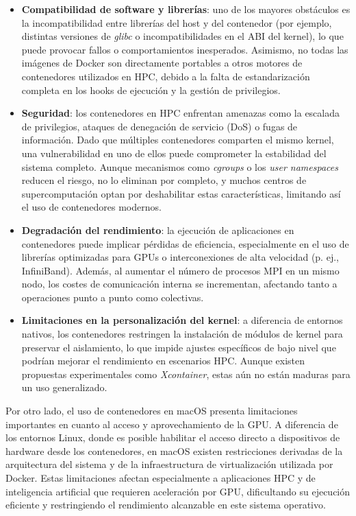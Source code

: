 \begin{itemize}
    \item \textbf{Compatibilidad de software y librerías}: uno de los mayores obstáculos es la incompatibilidad entre librerías del host y del contenedor (por ejemplo, distintas versiones de \textit{glibc} o incompatibilidades en el ABI del kernel), lo que puede provocar fallos o comportamientos inesperados. Asimismo, no todas las imágenes de Docker son directamente portables a otros motores de contenedores utilizados en HPC, debido a la falta de estandarización completa en los hooks de ejecución y la gestión de privilegios.

    \item \textbf{Seguridad}: los contenedores en HPC enfrentan amenazas como la escalada de privilegios, ataques de denegación de servicio (DoS) o fugas de información. Dado que múltiples contenedores comparten el mismo kernel, una vulnerabilidad en uno de ellos puede comprometer la estabilidad del sistema completo. Aunque mecanismos como \textit{cgroups} o los \textit{user namespaces} reducen el riesgo, no lo eliminan por completo, y muchos centros de supercomputación optan por deshabilitar estas características, limitando así el uso de contenedores modernos.

    \item \textbf{Degradación del rendimiento}: la ejecución de aplicaciones en contenedores puede implicar pérdidas de eficiencia, especialmente en el uso de librerías optimizadas para GPUs o interconexiones de alta velocidad (p. ej., InfiniBand). Además, al aumentar el número de procesos MPI en un mismo nodo, los costes de comunicación interna se incrementan, afectando tanto a operaciones punto a punto como colectivas.

    \item \textbf{Limitaciones en la personalización del kernel}: a diferencia de entornos nativos, los contenedores restringen la instalación de módulos de kernel para preservar el aislamiento, lo que impide ajustes específicos de bajo nivel que podrían mejorar el rendimiento en escenarios HPC. Aunque existen propuestas experimentales como \textit{Xcontainer}, estas aún no están maduras para un uso generalizado.
\end{itemize}

Por otro lado, el uso de contenedores en macOS presenta limitaciones importantes en cuanto al acceso y aprovechamiento de la GPU. A diferencia de los entornos Linux, donde es posible habilitar el acceso directo a dispositivos de hardware desde los contenedores, en macOS existen restricciones derivadas de la arquitectura del sistema y de la infraestructura de virtualización utilizada por Docker. Estas limitaciones afectan especialmente a aplicaciones HPC y de inteligencia artificial que requieren aceleración por GPU, dificultando su ejecución eficiente y restringiendo el rendimiento alcanzable en este sistema operativo.

